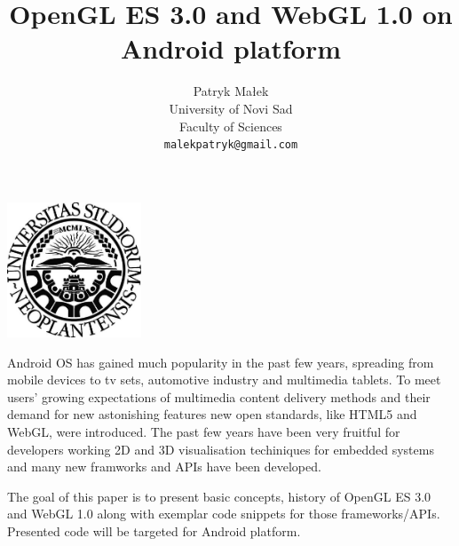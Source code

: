 \documentclass[a4paper,12pt]{article}
\renewenvironment{abstract}
 {\small
  \begin{center}
  \bfseries \abstractname\vspace{-.5em}\vspace{0pt}
  \end{center}
  \list{}{
    \setlength{\leftmargin}{1cm}%
    \setlength{\rightmargin}{\leftmargin}%
  }%
  \item\relax}
 {\endlist}
\begin{document}
\label{Title} 
\title{OpenGL ES 3.0 and WebGL 1.0 on Android platform}
\author{Patryk Małek\\
        University of Novi Sad\\
        Faculty of Sciences\\
        \texttt{malekpatryk@gmail.com}
        }
\date{}         %
\maketitle
\thispagestyle{empty}

\vspace{5pc}

\centerline{
\includegraphics[width=0.3\textwidth,height=0.3\textheight,keepaspectratio]{NoviSadLogoGray.jpg}
}

\vspace{5pc}

\begin{abstract}
\label{Abstract}
Android OS has gained much popularity in the past few years, spreading from mobile devices to tv sets, automotive industry and multimedia tablets. 
To meet users' growing expectations of multimedia content delivery methods and their demand for new astonishing features new open standards, like HTML5 and WebGL, were introduced. 
The past few years have been very fruitful for developers working 2D and 3D visualisation techiniques for embedded systems and many new framworks and APIs have been developed.

The goal of this paper is to present basic concepts, history of OpenGL ES 3.0 and WebGL 1.0 along with exemplar code snippets for those frameworks/APIs.
Presented code will be targeted for Android platform.
\end{abstract}

\pagebreak

\end{document}
